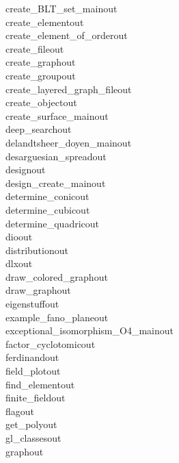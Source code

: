\begin{tabbing}
create\_BLT\_set\_mainout\\[0pt]
create\_elementout\\[0pt]
create\_element\_of\_orderout\\[0pt]
create\_fileout\\[0pt]
create\_graphout\\[0pt]
create\_groupout\\[0pt]
create\_layered\_graph\_fileout\\[0pt]
create\_objectout\\[0pt]
create\_surface\_mainout\\[0pt]
deep\_searchout\\[0pt]
delandtsheer\_doyen\_mainout\\[0pt]
desarguesian\_spreadout\\[0pt]
designout\\[0pt]
design\_create\_mainout\\[0pt]
determine\_conicout\\[0pt]
determine\_cubicout\\[0pt]
determine\_quadricout\\[0pt]
dioout\\[0pt]
distributionout\\[0pt]
dlxout\\[0pt]
draw\_colored\_graphout\\[0pt]
draw\_graphout\\[0pt]
eigenstuffout\\[0pt]
example\_fano\_planeout\\[0pt]
exceptional\_isomorphism\_O4\_mainout\\[0pt]
factor\_cyclotomicout\\[0pt]
ferdinandout\\[0pt]
field\_plotout\\[0pt]
find\_elementout\\[0pt]
finite\_fieldout\\[0pt]
flagout\\[0pt]
get\_polyout\\[0pt]
gl\_classesout\\[0pt]
graphout\\[0pt]

\end{tabbing}
